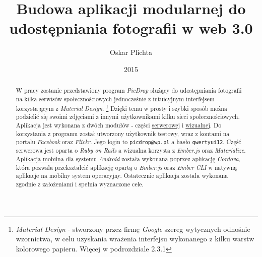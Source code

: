 \documentclass[openright]{xmgr}
\author   {Oskar Plichta}
\title    {Budowa aplikacji modularnej do udostępniania fotografii  w web 3.0}
\date     {2015}
\begin{document}
\begin{abstract}
W pracy zostanie przedstawiony program \textit{PicDrop} służący do udostępniania fotografii na kilka serwisów społecznościowych jednocześnie z intuicyjnym interfejsem korzystającym z \textit{Material Design}. \footnote{\textit{Material Design} - stworzony przez firmę \textit{ Google} szereg wytycznych odnośnie wzornictwa, w celu uzyskania wrażenia interfejsu wykonanego z kilku warstw kolorowego papieru. Więcej w podrozdziale 2.3.1} Dzięki temu w prosty i szybki sposób można podzielić się swoimi zdjęciami z innymi użytkownikami kilku sieci społecznościowych. Aplikacja jest wykonana z dwóch modułów - części \href{https://picdrop2.herokuapp.com/}{serwerowej} i \href{https://picdropember.herokuapp.com/}{wizualnej}. Do korzystania z programu został utworzony użytkownik testowy, wraz z kontami na portalu \textit{Facebook} oraz \textit{Flickr}. Jego login to \verb|picdrop@wp.pl| a hasło \verb|qwertyui12|.  Część serwerowa jest oparta o \textit{Ruby on Rails} a wizualna korzysta z \textit{Ember.js} oraz \textit{Materialize}. \href{https://drive.google.com/file/d/0B3-ow_b9lUQGYlVnVkhIel90Sjg/view?usp=sharing}{Aplikacja mobilna} dla systemu \textit{Android}  została wykonana poprzez aplikację \textit{Cordova}, która pozwala przekształcić aplikację opartą o \textit{Ember.js} oraz \textit{Ember CLI} w natywną aplikacje na mobilny system operacyjny. Ostatecznie aplikacja została wykonana zgodnie z założeniami i spełnia wyznaczone cele.

\end{abstract}
\end{document}
